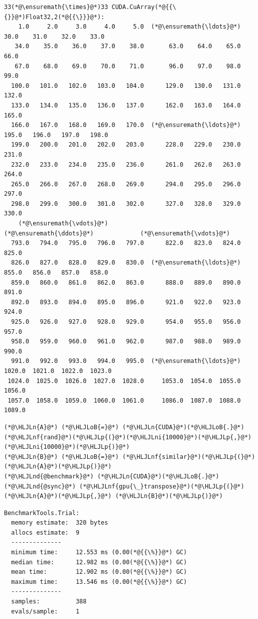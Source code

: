 \documentclass[12pt,a4paper]{article}
\newcommand{\HLJLn}[1]{#1}
\newcommand{\HLJLnd}[1]{\textcolor[RGB]{214,102,97}{#1}}
\newcommand{\HLJLnf}[1]{\textcolor[RGB]{66,102,213}{#1}}
\newcommand{\HLJLni}[1]{\textcolor[RGB]{59,151,46}{#1}}
\newcommand{\HLJLoB}[1]{\textcolor[RGB]{102,102,102}{\textbf{#1}}}
\newcommand{\HLJLp}[1]{#1}
\begin{document}
\begin{lstlisting}
33(*@\ensuremath{\times}@*)33 CUDA.CuArray(*@{{\{}}@*)Float32,2(*@{{\}}}@*):
    1.0     2.0     3.0     4.0     5.0  (*@\ensuremath{\ldots}@*)    30.0    31.0    32.0    33.0
   34.0    35.0    36.0    37.0    38.0       63.0    64.0    65.0    66.0
   67.0    68.0    69.0    70.0    71.0       96.0    97.0    98.0    99.0
  100.0   101.0   102.0   103.0   104.0      129.0   130.0   131.0   132.0
  133.0   134.0   135.0   136.0   137.0      162.0   163.0   164.0   165.0
  166.0   167.0   168.0   169.0   170.0  (*@\ensuremath{\ldots}@*)   195.0   196.0   197.0   198.0
  199.0   200.0   201.0   202.0   203.0      228.0   229.0   230.0   231.0
  232.0   233.0   234.0   235.0   236.0      261.0   262.0   263.0   264.0
  265.0   266.0   267.0   268.0   269.0      294.0   295.0   296.0   297.0
  298.0   299.0   300.0   301.0   302.0      327.0   328.0   329.0   330.0
    (*@\ensuremath{\vdots}@*)                                    (*@\ensuremath{\ddots}@*)             (*@\ensuremath{\vdots}@*)            
  793.0   794.0   795.0   796.0   797.0      822.0   823.0   824.0   825.0
  826.0   827.0   828.0   829.0   830.0  (*@\ensuremath{\ldots}@*)   855.0   856.0   857.0   858.0
  859.0   860.0   861.0   862.0   863.0      888.0   889.0   890.0   891.0
  892.0   893.0   894.0   895.0   896.0      921.0   922.0   923.0   924.0
  925.0   926.0   927.0   928.0   929.0      954.0   955.0   956.0   957.0
  958.0   959.0   960.0   961.0   962.0      987.0   988.0   989.0   990.0
  991.0   992.0   993.0   994.0   995.0  (*@\ensuremath{\ldots}@*)  1020.0  1021.0  1022.0  1023.0
 1024.0  1025.0  1026.0  1027.0  1028.0     1053.0  1054.0  1055.0  1056.0
 1057.0  1058.0  1059.0  1060.0  1061.0     1086.0  1087.0  1088.0  1089.0
\end{lstlisting}


\begin{lstlisting}
(*@\HLJLn{A}@*) (*@\HLJLoB{=}@*) (*@\HLJLn{CUDA}@*)(*@\HLJLoB{.}@*)(*@\HLJLnf{rand}@*)(*@\HLJLp{(}@*)(*@\HLJLni{10000}@*)(*@\HLJLp{,}@*) (*@\HLJLni{10000}@*)(*@\HLJLp{)}@*)
(*@\HLJLn{B}@*) (*@\HLJLoB{=}@*) (*@\HLJLnf{similar}@*)(*@\HLJLp{(}@*)(*@\HLJLn{A}@*)(*@\HLJLp{)}@*)
(*@\HLJLnd{@benchmark}@*) (*@\HLJLn{CUDA}@*)(*@\HLJLoB{.}@*)(*@\HLJLnd{@sync}@*) (*@\HLJLnf{gpu{\_}transpose}@*)(*@\HLJLp{(}@*)(*@\HLJLn{A}@*)(*@\HLJLp{,}@*) (*@\HLJLn{B}@*)(*@\HLJLp{)}@*)
\end{lstlisting}

\begin{lstlisting}
BenchmarkTools.Trial: 
  memory estimate:  320 bytes
  allocs estimate:  9
  --------------
  minimum time:     12.553 ms (0.00(*@{{\%}}@*) GC)
  median time:      12.982 ms (0.00(*@{{\%}}@*) GC)
  mean time:        12.902 ms (0.00(*@{{\%}}@*) GC)
  maximum time:     13.546 ms (0.00(*@{{\%}}@*) GC)
  --------------
  samples:          388
  evals/sample:     1
\end{lstlisting}
\end{document}

